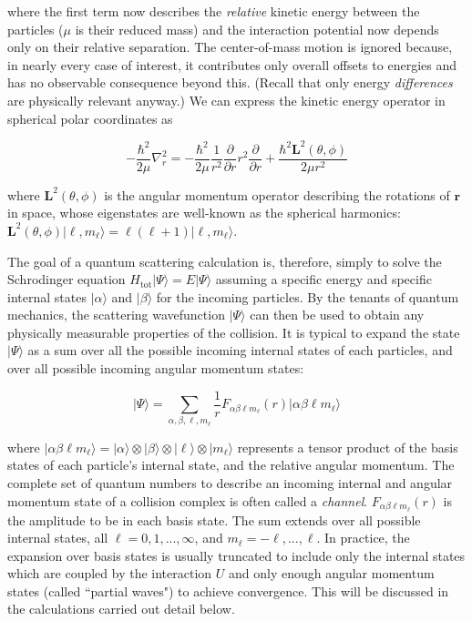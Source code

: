 \documentclass[%
 reprint,
 amsmath,amssymb,
 aps,
 nofootinbib
]{revtex4-1}
\begin{document}
\noindent where the first term now describes the \textit{relative} kinetic energy between the particles ($\mu$ is their reduced mass) and the interaction potential now depends only on their relative separation. The center-of-mass motion is ignored because, in nearly every case of interest, it contributes only overall offsets to energies and has no observable consequence beyond this. (Recall that only energy \textit{differences} are physically relevant anyway.) We can express the kinetic energy operator in spherical polar coordinates as

\begin{equation}
-\frac{\hbar^2}{2\mu} \nabla_r^2 = -\frac{\hbar^2}{2\mu} \frac{1}{r^2} \frac{\partial}{\partial r} r^2 \frac{\partial}{\partial r} + \frac{\hbar^2 \mathbf{L}^2(\theta,\phi)}{2\mu r^2}
\end{equation}

\noindent where $\mathbf{L}^2(\theta,\phi)$ is the angular momentum operator describing the rotations of $\mathbf{r}$ in space, whose eigenstates are well-known as the spherical harmonics: $\mathbf{L}^2(\theta,\phi) \lvert \ell, m_\ell \rangle = \ell(\ell+1) \lvert \ell,m_\ell \rangle$. 

The goal of a quantum scattering calculation is, therefore, simply to solve the Schrodinger equation $H_\text{tot} \lvert \Psi \rangle = E \lvert \Psi \rangle$ assuming a specific energy and specific internal states $\lvert \alpha \rangle$ and $\lvert \beta \rangle$ for the incoming particles. By the tenants of quantum mechanics, the scattering wavefunction $\lvert \Psi \rangle$ can then be used to obtain any physically measurable properties of the collision. It is typical to expand the state $\lvert \Psi \rangle$ as a sum over all the possible incoming internal states of each particles, and over all possible incoming angular momentum states: 

\begin{equation}
\lvert \Psi \rangle =  \sum_{\alpha,\beta,\ell,m_\ell} \frac{1}{r} F_{\alpha \beta \ell m_\ell}(r) \lvert \alpha \beta \ell m_\ell \rangle
\label{eq:BasisExpansion}
\end{equation}

\noindent where $\lvert \alpha \beta \ell m_\ell \rangle = \lvert \alpha \rangle \otimes \lvert \beta \rangle \otimes \lvert \ell \rangle \otimes \lvert m_\ell \rangle$ represents a tensor product of the basis states of each particle's internal state, and the relative angular momentum. The complete set of quantum numbers to describe an incoming internal and angular momentum state of a collision complex is often called a \textit{channel}. $F_{\alpha \beta \ell m_\ell}(r)$ is the amplitude to be in each basis state. The sum extends over all possible internal states, all $\ell = 0, 1, ..., \infty$, and $m_\ell = -\ell, ..., \ell$. In practice, the expansion over basis states is usually truncated to include only the internal states which are coupled by the interaction $U$ and only enough angular momentum states (called ``partial waves") to achieve convergence. This will be discussed in the calculations carried out detail below. 
\end{document}
